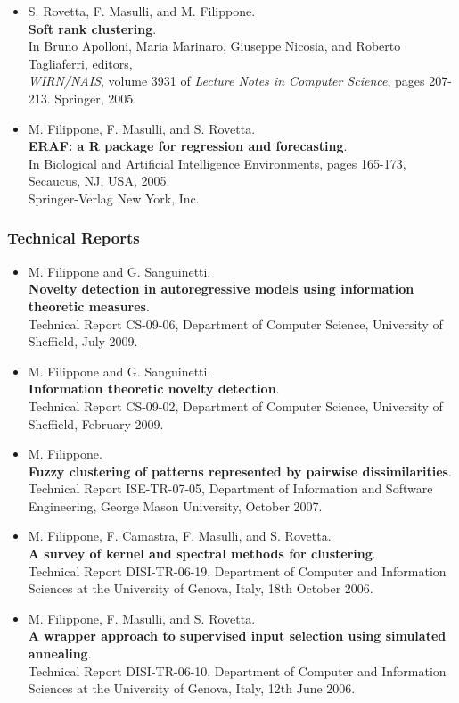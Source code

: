 \documentclass[a4paper,10pt]{article}
\begin{document}
\begin{itemize}
     \item  S. Rovetta, F. Masulli, and M. Filippone.
       \\\textbf{Soft rank clustering}.
       \\In Bruno Apolloni, Maria Marinaro, Giuseppe Nicosia, and Roberto Tagliaferri, editors, 
       \\\emph{WIRN/NAIS}, volume 3931 of \emph{Lecture Notes in Computer Science}, pages 207-213. Springer, 2005.
     \item  M. Filippone, F. Masulli, and S. Rovetta.
       \\\textbf{ERAF: a R package for regression and forecasting}.
       \\In Biological and Artificial Intelligence Environments, pages 165-173, Secaucus, NJ, USA, 2005.
       \\Springer-Verlag New York, Inc.
\end{itemize}

\subsubsection*{Technical Reports}
\begin{itemize}
     \item  M. Filippone and G. Sanguinetti.
       \\\textbf{Novelty detection in autoregressive models using information theoretic measures}.
       \\Technical Report CS-09-06, Department of Computer Science, University of Sheffield, July 2009.
     \item  M. Filippone and G. Sanguinetti.
       \\\textbf{Information theoretic novelty detection}.
       \\Technical Report CS-09-02, Department of Computer Science, University of Sheffield, February 2009.
     \item  M. Filippone.
       \\\textbf{Fuzzy clustering of patterns represented by pairwise dissimilarities}.
       \\Technical Report ISE-TR-07-05, Department of Information and Software Engineering, George Mason University, October 2007.
     \item  M. Filippone, F. Camastra, F. Masulli, and S. Rovetta.
       \\\textbf{A survey of kernel and spectral methods for clustering}.
       \\Technical Report DISI-TR-06-19,
       Department of Computer and Information Sciences at the University of Genova, Italy, 18th October 2006.
     \item  M. Filippone, F. Masulli, and S. Rovetta.
       \\\textbf{A wrapper approach to supervised input selection using simulated annealing}.
       \\Technical Report DISI-TR-06-10,
       Department of Computer and Information Sciences at the University of Genova, Italy, 12th June 2006.
\end{itemize}
\end{document}

